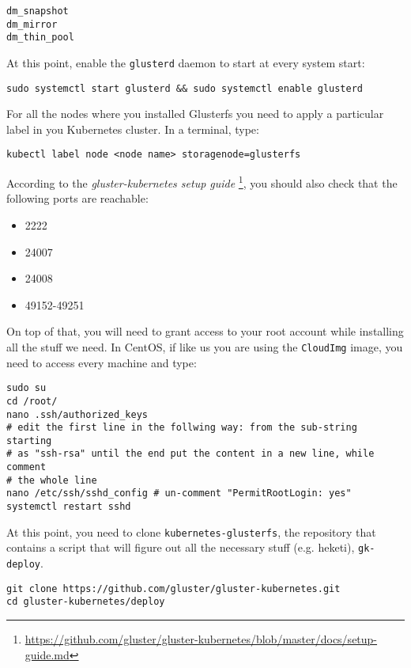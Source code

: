 \begin{lstlisting}
dm_snapshot
dm_mirror
dm_thin_pool
\end{lstlisting}

At this point, enable the \texttt{glusterd} daemon to start at every
system start:

\begin{lstlisting}
sudo systemctl start glusterd && sudo systemctl enable glusterd
\end{lstlisting}

For all the nodes where you installed Glusterfs you need to apply a particular
label in you Kubernetes cluster. In a terminal, type:
\begin{lstlisting}
kubectl label node <node name> storagenode=glusterfs
\end{lstlisting}

According to the \emph{gluster-kubernetes setup guide}
\footnote{\url{https://github.com/gluster/gluster-kubernetes/blob/master/docs/setup-guide.md}},
you should also check that the following ports are reachable:
\begin{itemize}
\item 2222
\item 24007
\item 24008
\item 49152-49251
\end{itemize}

On top of that, you will need to grant access to your root account while
installing all the stuff we need. In CentOS, if like us you are using the
\texttt{CloudImg} image, you need to access every machine and type:
\begin{lstlisting}
sudo su
cd /root/
nano .ssh/authorized_keys
# edit the first line in the follwing way: from the sub-string starting
# as "ssh-rsa" until the end put the content in a new line, while comment
# the whole line
nano /etc/ssh/sshd_config # un-comment "PermitRootLogin: yes"
systemctl restart sshd
\end{lstlisting}

At this point, you need to clone \texttt{kubernetes-glusterfs}, the repository
that contains a script that will figure out all the necessary stuff
(e.g. heketi), \texttt{gk-deploy}.
\begin{lstlisting}
git clone https://github.com/gluster/gluster-kubernetes.git
cd gluster-kubernetes/deploy
\end{lstlisting}

